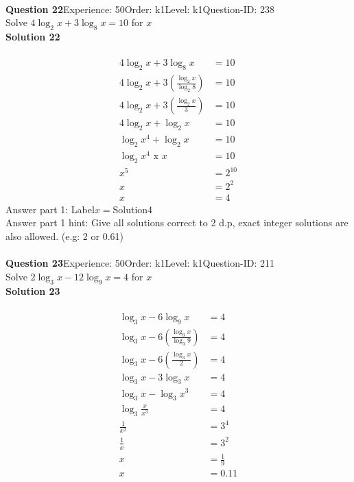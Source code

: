 \documentclass{article}
\begin{document}
\\[4pt]
\noindent\textbf{Question 22}\hspace{20pt}Experience: 50\hspace{20pt}Order: k1\hspace{20pt}Level: k1\hspace{20pt}Question-ID: 238\\[2pt]
Solve $4\log_{2}x+3\log_{8}x=10$ for $x$\\[4pt]
\noindent\textbf{Solution 22}\\[2pt]
\\[-35pt]\begin{align*}
4\log_{2}x+3\log_{8}x&=10\\[2pt]
4\log_{2}x+3\left(\displaystyle\frac{\log_{2}x}{\log_{2}8}\right)&=10\\[2pt]
4\log_{2}x+3\left(\displaystyle\frac{\log_{2}x}{3}\right)&=10\\[2pt]
4\log_{2}x+\log_{2}x&=10\\[2pt]
\log_{2}x^4+\log_{2}x&=10\\[2pt]
\log_{2}x^4\,\,\text{x}\,\,x&=10\\[2pt]
x^5&=2^{10}\\[2pt]
x&=2^2\\[2pt]
x&=4
\end{align*}
Answer part 1: \hspace{10pt}Label\hspace{10pt}$x=$\hspace{10pt}Solution\hspace{10pt}4\\
Answer part 1 hint: \hspace{15pt}Give all solutions correct to 2 d.p, exact integer solutions are also allowed. (e.g: 2 or 0.61)\\
\\[4pt]
\noindent\textbf{Question 23}\hspace{20pt}Experience: 50\hspace{20pt}Order: k1\hspace{20pt}Level: k1\hspace{20pt}Question-ID: 211\\[2pt]
Solve $2\log_{3}x-12\log_{9}x=4$ for $x$\\[4pt]
\noindent\textbf{Solution 23}\\[2pt]
\\[-35pt]\begin{align*}
\log_{3}x-6\log_{9}x&=4\\[2pt]
\log_{3}x-6\left(\displaystyle\frac{\log_{3}x}{\log_{3}9}\right)&=4\\[2pt]
\log_{3}x-6\left(\displaystyle\frac{\log_{3}x}{2}\right)&=4\\[2pt]
\log_{3}x-3\log_{3}x&=4\\[2pt]
\log_{3}x-\log_{3}x^3&=4\\[2pt]
\log_{3}\displaystyle\frac{x}{x^3}&=4\\[2pt]
\displaystyle\frac{1}{x^2}&=3^4\\[2pt]
\displaystyle\frac{1}{x}&=3^2\\[2pt]
x&=\displaystyle\frac{1}{9}\\[2pt]
x&=0.11
\end{align*}
\end{document}
